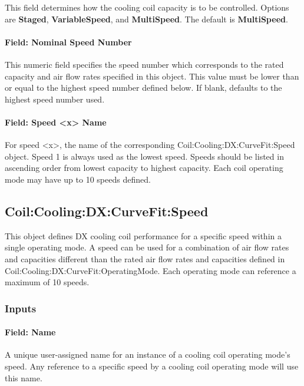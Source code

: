 This field determines how the cooling coil capacity is to be controlled. Options are \textbf{Staged}, \textbf{VariableSpeed}, and \textbf{MultiSpeed}. The default is \textbf{MultiSpeed}.

\paragraph{Field: Nominal Speed Number}\label{field-nominal-speed-number}

This numeric field specifies the speed number which corresponds to the rated capacity and air flow rates specified in this object. This value must be lower than or equal to the highest speed number defined below. If blank, defaults to the highest speed number used.

\paragraph{Field: Speed \textless{}x\textgreater{} Name}\label{field-speed-x-name}

For speed \textless{}x\textgreater{}, the name of the corresponding Coil:Cooling:DX:CurveFit:Speed object. Speed 1 is always used as the lowest speed. Speeds should be listed in ascending order from lowest capacity to highest capacity. Each coil operating mode may have up to 10 speeds defined.

\subsection{Coil:Cooling:DX:CurveFit:Speed}\label{coilcoolingdxcurvefitspeed}

This object defines DX cooling coil performance for a specific speed within a single operating mode. A speed can be used for a combination of air flow rates and capacities different than the rated air flow rates and capacities defined in Coil:Cooling:DX:CurveFit:OperatingMode. Each operating mode can reference a maximum of 10 speeds.

\subsubsection{Inputs}\label{inputs-04}

\paragraph{Field: Name}\label{field-name-04}

A unique user-assigned name for an instance of a cooling coil operating mode's speed. Any reference to a specific speed by a cooling coil operating mode will use this name.

